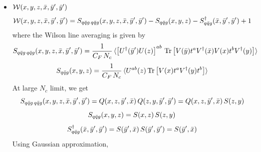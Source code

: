 \documentclass[9pt]{article}
\numberwithin{equation}{section}
\begin{document}
\begin{itemize}
\begin{align}
        \mathcal{W}(x,y',y',\Bar{x},\Bar{y},\Bar{z}) & = S_{q\Bar{q}g\,q\Bar{q}g}(x,y',y',\Bar{x},\Bar{y},\Bar{z}) -S_{q\Bar{q}g}(x,y',y') - S^{\dagger}_{q\Bar{q}g}(\Bar{x},\Bar{y},\Bar{z}) + 1
    \end{align}
where the Wilson line averaging is given by 
$$S_{q\Bar{q}g\,q\Bar{q}g}(x,y',y',\Bar{x},\Bar{y},\Bar{z}) =  \frac{1}{C_{F}\,N_{c}}\, \langle \left[U^{\dagger}(\Bar{z})U(y')\right]^{ab}\, \text{Tr}\left[V(\Bar{y})t^{a}V^{\dagger}(\Bar{x})V(x)t^{b}V^{\dagger}(y')\right] \rangle$$
$$S_{q\Bar{q}g}(x,y',y') =  \frac{1}{C_{F}\,N_{c}}\, \langle U^{ab}(y')\,\text{Tr}\left[V(x)t^{a}V^{\dagger}(y')t^{b}\right]\rangle$$
At large $N_{c}$ limit, we get
$$S_{q\Bar{q}g\,q\Bar{q}g}(x,y',y',\Bar{x},\Bar{y},\Bar{z}) = Q(x,y',\Bar{z},\Bar{x})\, Q(y',y',\Bar{y},\Bar{z}) = Q(x,y',\Bar{z},\Bar{x})\, S(\Bar{y},\Bar{z})$$
$$S_{q\Bar{q}g}(x,y',y') = S(x,y')\, S(y',y') = S(x,y') $$
$$S^{\dagger}_{q\Bar{q}g}(\Bar{x},\Bar{y},\Bar{z}) = S(\Bar{z},\Bar{x})\, S(\Bar{y},\Bar{z})$$
Using Gaussian approximation,
\begin{align}
    Q(x,y',\Bar{z},\Bar{x}) & = S(x,y')\,S(\Bar{z},\Bar{x}) - \frac{F(x,y';\Bar{z},\Bar{x})}{F(x,\Bar{z};y',\Bar{x})}\, \left[S(x,y')\,S(\Bar{z},\Bar{x})-S(x,\Bar{x})\, S(\Bar{z},y')\right]
\end{align}
\item $\mathcal{W}(x,y,z,\Bar{x},\Bar{y}',\Bar{y}')$
\begin{align}
        \mathcal{W}(x,y,z,\Bar{x},\Bar{y}',\Bar{y}') & = S_{q\Bar{q}g\,q\Bar{q}g}(x,y,z,\Bar{x},\Bar{y}',\Bar{y}') -S_{q\Bar{q}g}(x,y,z) - S^{\dagger}_{q\Bar{q}g}(\Bar{x},\Bar{y}',\Bar{y}') + 1
    \end{align}
where the Wilson line averaging is given by 
$$S_{q\Bar{q}g\,q\Bar{q}g}(x,y,z,\Bar{x},\Bar{y}',\Bar{y}') = \frac{1}{C_{F}\,N_{c}}\, \langle \left[U^{\dagger}(\Bar{y}')U(z)\right]^{ab}\, \text{Tr}\left[V(\Bar{y})t^{a}V^{\dagger}(\Bar{x})V(x)t^{b}V^{\dagger}(y)\right] \rangle$$
$$S_{q\Bar{q}g}(x,y,z) =  \frac{1}{C_{F}\,N_{c}}\, \langle U^{ab}(z)\,\text{Tr}\left[V(x)t^{a}V^{\dagger}(y)t^{b}\right]\rangle$$
At large $N_{c}$ limit, we get
$$S_{q\Bar{q}g\,q\Bar{q}g}(x,y,z,\Bar{x},\Bar{y}',\Bar{y}') = Q(x,z,\Bar{y}',\Bar{x})\, Q(z,y,\Bar{y}',\Bar{y}') = Q(x,z,\Bar{y}',\Bar{x})\, S(z,y) $$
$$S_{q\Bar{q}g}(x,y,z) = S(x,z)\, S(z,y)$$
$$S^{\dagger}_{q\Bar{q}g}(\Bar{x},\Bar{y}',\Bar{y}') = S(\Bar{y}',\Bar{x})\, S(\Bar{y}',\Bar{y}') = S(\Bar{y}',\Bar{x})$$
Using Gaussian approximation,
\begin{align}

\end{align}
\end{itemize}
\end{document}
